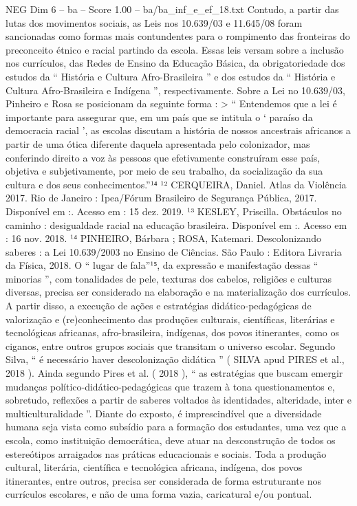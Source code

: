 \begin{textsample}{NEG Dim 6 – ba – Score 1.00 – ba/ba\_inf\_e\_ef\_18.txt}
Contudo, a partir das lutas dos movimentos sociais, as Leis nos 10.639/03 e 11.645/08 foram sancionadas como formas mais contundentes para o rompimento das fronteiras do preconceito étnico e racial partindo da escola.
Essas leis versam sobre a inclusão nos currículos, das Redes de Ensino da Educação Básica, da obrigatoriedade dos estudos da “ História e Cultura Afro-Brasileira ” e dos estudos da “ História e Cultura Afro-Brasileira e Indígena ”, respectivamente.
Sobre a Lei no 10.639/03, Pinheiro e Rosa se posicionam da seguinte forma : > “ Entendemos que a lei é importante para assegurar que, em um país que se intitula o ‘ paraíso da democracia racial ’, as escolas discutam a história de nossos ancestrais africanos a partir de uma ótica diferente daquela apresentada pelo colonizador, mas conferindo direito a voz às pessoas que efetivamente construíram esse país, objetiva e subjetivamente, por meio de seu trabalho, da socialização da sua cultura e dos seus conhecimentos.”¹⁴ ¹² CERQUEIRA, Daniel.
Atlas da Violência 2017.
Rio de Janeiro : Ipea/Fórum Brasileiro de Segurança Pública, 2017.
Disponível em :.
Acesso em : 15 dez. 2019. ¹³ KESLEY, Priscilla.
Obstáculos no caminho : desigualdade racial na educação brasileira.
Disponível em :.
Acesso em : 16 nov. 2018. ¹⁴ PINHEIRO, Bárbara ; ROSA, Katemari.
Descolonizando saberes : a Lei 10.639/2003 no Ensino de Ciências.
São Paulo : Editora Livraria da Física, 2018.
O “ lugar de fala”¹⁵, da expressão e manifestação dessas “ minorias ”, com tonalidades de pele, texturas dos cabelos, religiões e culturas diversas, precisa ser considerado na elaboração e na materialização dos currículos.
A partir disso, a execução de ações e estratégias didático-pedagógicas de valorização e (re)conhecimento das produções culturais, científicas, literárias e tecnológicas africanas, afro-brasileira, indígenas, dos povos itinerantes, como os ciganos, entre outros grupos sociais que transitam o universo escolar.
Segundo Silva, “ é necessário haver descolonização didática ” ( SILVA apud PIRES et al., 2018 ).
Ainda segundo Pires et al. ( 2018 ), “ as estratégias que buscam emergir mudanças político-didático-pedagógicas que trazem à tona questionamentos e, sobretudo, reflexões a partir de saberes voltados às identidades, alteridade, inter e multiculturalidade ”.
Diante do exposto, é imprescindível que a diversidade humana seja vista como subsídio para a formação dos estudantes, uma vez que a escola, como instituição democrática, deve atuar na desconstrução de todos os estereótipos arraigados nas práticas educacionais e sociais.
Toda a produção cultural, literária, científica e tecnológica africana, indígena, dos povos itinerantes, entre outros, precisa ser considerada de forma estruturante nos currículos escolares, e não de uma forma vazia, caricatural e/ou pontual.

\end{textsample}
